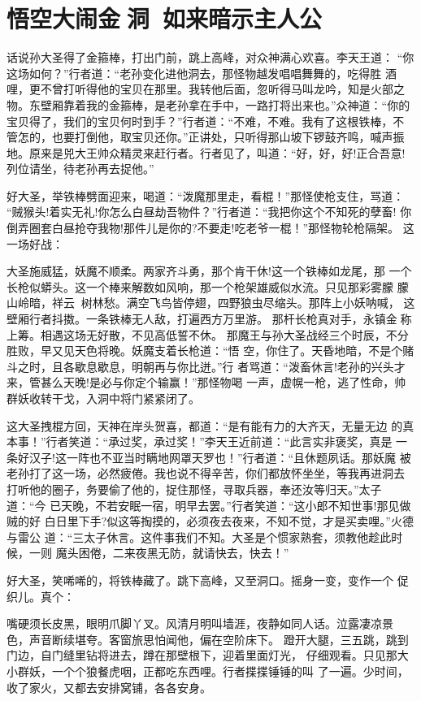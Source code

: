 \chapter{悟空大闹金洞~如来暗示主人公}

话说孙大圣得了金箍棒，打出门前，跳上高峰，对众神满心欢喜。李天王道：
“你这场如何？”行者道：“老孙变化进他洞去，那怪物越发唱唱舞舞的，吃得胜
酒哩，更不曾打听得他的宝贝在那里。我转他后面，忽听得马叫龙吟，知是火部之
物。东壁厢靠着我的金箍棒，是老孙拿在手中，一路打将出来也。”众神道：“你的
宝贝得了，我们的宝贝何时到手？”行者道：“不难，不难。我有了这根铁棒，不
管怎的，也要打倒他，取宝贝还你。”正讲处，只听得那山坡下锣鼓齐鸣，喊声振
地。原来是兕大王帅众精灵来赶行者。行者见了，叫道：“好，好，好!正合吾意!
列位请坐，待老孙再去捉他。”

好大圣，举铁棒劈面迎来，喝道：“泼魔那里走，看棍！”那怪使枪支住，骂道：
“贼猴头!着实无礼!你怎么白昼劫吾物件？”行者道：“我把你这个不知死的孽畜!
你倒弄圈套白昼抢夺我物!那件儿是你的?不要走!吃老爷一棍！”那怪物轮枪隔架。
这一场好战：

大圣施威猛，妖魔不顺柔。两家齐斗勇，那个肯干休!这一个铁棒如龙尾，那
一个长枪似蟒头。这一个棒来解数如风响，那一个枪架雄威似水流。只见那彩雾朦
朦山岭暗，祥云树林愁。满空飞鸟皆停翅，四野狼虫尽缩头。那阵上小妖呐喊，
这壁厢行者抖擞。一条铁棒无人敌，打遍西方万里游。
那杆长枪真对手，永镇金称上筹。相遇这场无好散，不见高低誓不休。
那魔王与孙大圣战经三个时辰，不分胜败，早又见天色将晚。妖魔支着长枪道：“悟
空，你住了。天昏地暗，不是个赌斗之时，且各歇息歇息，明朝再与你比迸。”行
者骂道：“泼畜休言!老孙的兴头才来，管甚么天晚!是必与你定个输赢！”那怪物喝
一声，虚幌一枪，逃了性命，帅群妖收转干戈，入洞中将门紧紧闭了。

这大圣拽棍方回，天神在岸头贺喜，都道：“是有能有力的大齐天，无量无边
的真本事！”行者笑道：“承过奖，承过奖！”李天王近前道：“此言实非褒奖，真是
一条好汉子!这一阵也不亚当时瞒地网罩天罗也！”行者道：“且休题夙话。那妖魔
被老孙打了这一场，必然疲倦。我也说不得辛苦，你们都放怀坐坐，等我再进洞去
打听他的圈子，务要偷了他的，捉住那怪，寻取兵器，奉还汝等归天。”太子道：“今
已天晚，不若安眠一宿，明早去罢。”行者笑道：“这小郎不知世事!那见做贼的好
白日里下手?似这等掏摸的，必须夜去夜来，不知不觉，才是买卖哩。”火德与雷公
道：“三太子休言。这件事我们不知。大圣是个惯家熟套，须教他趁此时候，一则
魔头困倦，二来夜黑无防，就请快去，快去！”

好大圣，笑唏唏的，将铁棒藏了。跳下高峰，又至洞口。摇身一变，变作一个
促织儿。真个：

嘴硬须长皮黑，眼明爪脚丫叉。风清月明叫墙涯，夜静如同人话。泣露凄凉景
色，声音断续堪夸。客窗旅思怕闻他，偏在空阶床下。
蹬开大腿，三五跳，跳到门边，自门缝里钻将进去，蹲在那壁根下，迎着里面灯光，
仔细观看。只见那大小群妖，一个个狼餐虎咽，正都吃东西哩。行者揲揲锤锤的叫
了一遍。少时间，收了家火，又都去安排窝铺，各各安身。

